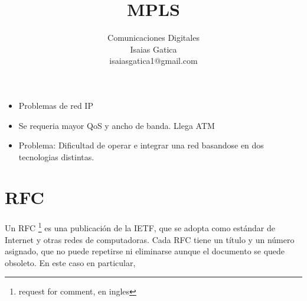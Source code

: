 \documentclass[a4paper]{article}
\title{MPLS}
\author{Comunicaciones Digitales\\
  \small Isaias Gatica\\
  \small isaiasgatica1@gmail.com\\
  \date{}
}
\begin{document}
\maketitle

\begin{itemize}
    \item Problemas de red IP
    \item Se requeria mayor QoS y ancho de banda. Llega ATM
    \item Problema: Dificultad de operar e integrar una red basandose en dos tecnologias distintas.
\end{itemize}
\section{RFC}
Un RFC \footnote{request for comment, en ingles} es una publicación de la IETF, que se adopta como estándar de Internet y otras redes de computadoras. Cada RFC tiene un título y un número asignado, que no puede repetirse ni eliminarse aunque el documento se quede obsoleto.
En este caso en particular, 
\end{document}
